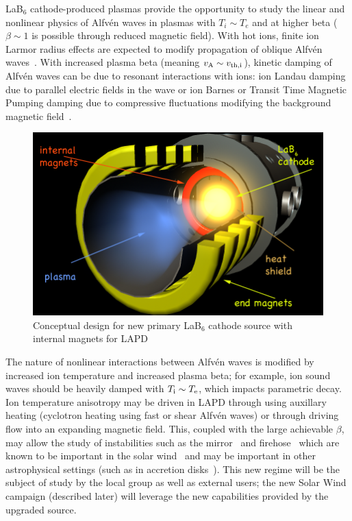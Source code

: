 \documentclass[11pt]{article}
\renewcommand{\cite}{\citep}
\begin{document}
LaB$_6$ cathode-produced plasmas provide the opportunity to study the
linear and nonlinear physics of Alfv\'{e}n waves in plasmas with $T_i
\sim T_e$ and at higher beta ($\beta \sim 1$ is possible through
reduced magnetic field).  With hot ions, finite ion Larmor radius
effects are expected to modify propagation of oblique Alfv\'{e}n
waves~\cite{hasegawa76,lysak96}.  
With increased plasma beta (meaning
$v_{\rm A} \sim v_{\rm th,i}$), kinetic damping of Alfv\'{e}n waves
can be due to resonant interactions with ions: ion Landau damping due
to parallel electric fields in the wave or ion Barnes or Transit Time
Magnetic Pumping damping due to compressive fluctuations modifying the
background magnetic field~\cite{barnes66}.  
\begin{figure}
\begin{center}
\includegraphics[width=3.5truein]{lab6-proposal}
\caption{\small Conceptual design for new primary LaB$_6$ cathode source with
  internal magnets for LAPD}\label{newcath}
\end{center}
\end{figure}
The nature of nonlinear
interactions between Alfv\'{e}n waves is modified by increased ion
temperature and increased plasma beta; for example, ion sound waves
should be heavily damped with $T_{\rm i} \sim T_{\rm e}$, which
impacts parametric decay.  Ion temperature anisotropy may be driven
in LAPD through using auxillary heating (cyclotron heating using fast
or shear Alfv\'{e}n waves) or through driving flow into an expanding
magnetic field.  This, coupled with the
large achievable $\beta$, may allow the study of 
instabilities such as the mirror~\cite{gary92} and firehose~\cite{gary98} which are known to be
important in the solar wind~\cite{hellinger06,bale09} and may be important in other
astrophysical settings (such as in accretion disks~\cite{schekochihin08}).   This
new regime will be the subject of study by the local group as well as
external users; the new Solar Wind campaign (described later) will
leverage the new capabilities provided by the upgraded source.
\end{document}

